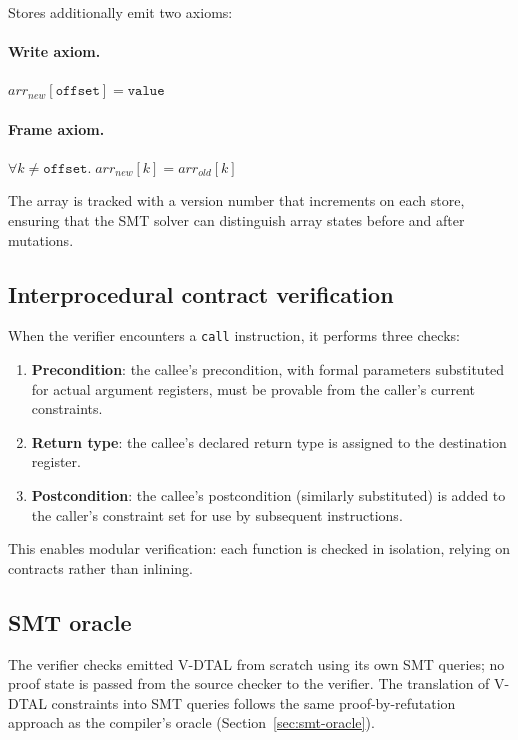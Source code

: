 \noindent Stores additionally emit two axioms: 
\begin{tcolorbox}[colback=blue!5!white,colframe=blue!75!black]
  \paragraph{Write axiom.} $\mathit{arr}_{\mathit{new}}[\texttt{offset}] = \texttt{value}$ \\

  \paragraph{Frame axiom.} $\forall k \ne \texttt{offset}.\; \mathit{arr}_{\mathit{new}}[k] = \mathit{arr}_{\mathit{old}}[k]$
\end{tcolorbox}
The array is tracked with a version number that increments on each store, ensuring that the SMT solver can distinguish array states before and after mutations.

\subsection{Interprocedural contract verification}

When the verifier encounters a \texttt{call} instruction, it performs three checks:

\begin{enumerate}
  \item \textbf{Precondition}: the callee's precondition, with formal parameters substituted for actual argument registers, must be provable from the caller's current constraints.
  \item \textbf{Return type}: the callee's declared return type is assigned to the destination register.
  \item \textbf{Postcondition}: the callee's postcondition (similarly substituted) is added to the caller's constraint set for use by subsequent instructions.
\end{enumerate}

This enables modular verification: each function is checked in isolation, relying on contracts rather than inlining.

\subsection{SMT oracle}

The verifier checks emitted V-DTAL from scratch using its own SMT queries; no proof state is passed from the source checker to the verifier. The translation of V-DTAL constraints into SMT queries follows the same proof-by-refutation approach as the compiler's oracle (Section~\ref{sec:smt-oracle}).

